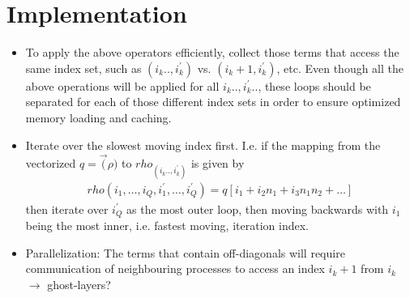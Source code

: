 \documentclass[letterpaper]{article}
\begin{document}
\section{Implementation}

\begin{itemize}
    \item To apply the above operators efficiently, collect those terms that access the same index set, such as $(i_k..,i_k^\prime)$ vs. $(i_k+1, i_k^\prime)$, etc. Even though all the above operations will be applied for all $i_k.., i_k^\prime..$, these loops should be separated for each of those different index sets in order to ensure optimized memory loading and caching.
    \item  Iterate over the slowest moving index first. I.e. if the mapping from the vectorized $q = \vec(\rho)$ to $rho_(i_k..,i_k^\prime)$ is given by
    \begin{align}
        rho(i_1,\dots,i_Q,i_1^\prime,\dots,i_Q^\prime) = q[i_1 + i_2n_1 + i_3n_1n_2 + \dots]
    \end{align}
    then iterate over $i_Q^\prime$ as the most outer loop, then moving backwards with $i_1$ being the most inner, i.e. fastest moving, iteration index.
    \item Parallelization: The terms that contain off-diagonals will require communication of neighbouring processes to access an index $i_k+1$ from $i_k$ $\rightarrow$ ghost-layers?
\end{itemize}
\end{document}
